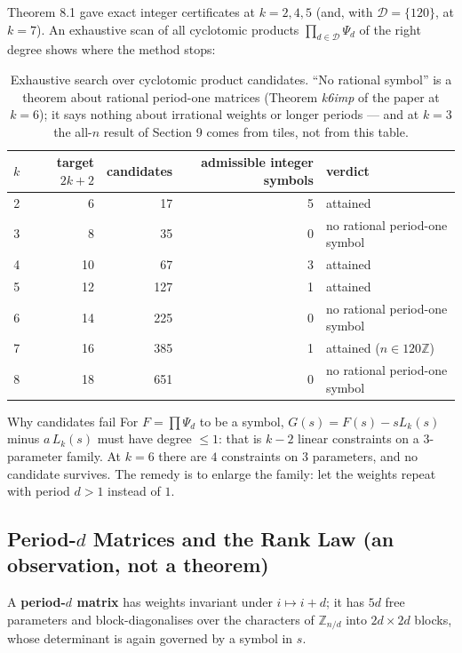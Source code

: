 \documentclass[11pt]{article}
\begin{document}
Theorem 8.1 gave exact integer certificates at $k=2,4,5$ (and, with $\mathcal D=\{120\}$, at $k=7$). An exhaustive scan of all cyclotomic products $\prod_{d\in\mathcal D}\Psi_d$ of the right degree shows where the method stops:

\begin{table}[htbp]
\centering
\begin{tabular}{crrrl}
\toprule
$k$ & target $2k+2$ & candidates & admissible integer symbols & verdict \\
\midrule
2 & 6 & 17 & 5 & attained \\
3 & 8 & 35 & 0 & no rational period-one symbol \\
4 & 10 & 67 & 3 & attained \\
5 & 12 & 127 & 1 & attained \\
6 & 14 & 225 & 0 & no rational period-one symbol \\
7 & 16 & 385 & 1 & attained ($n\in120\mathbb Z$) \\
8 & 18 & 651 & 0 & no rational period-one symbol \\
\bottomrule
\end{tabular}
\caption{Exhaustive search over cyclotomic product candidates. ``No rational symbol'' is a theorem about rational period-one matrices (Theorem \emph{k6imp} of the paper at $k=6$); it says nothing about irrational weights or longer periods --- and at $k=3$ the all-$n$ result of Section 9 comes from tiles, not from this table.}
\label{tab:exhaustive}
\end{table}

\begin{callbox}{Why candidates fail}
For $F=\prod\Psi_d$ to be a symbol, $G(s)=F(s)-sL_k(s)$ minus $a\,L_k(s)$ must have degree $\le1$: that is $k-2$ linear constraints on a 3-parameter family. At $k=6$ there are $4$ constraints on $3$ parameters, and no candidate survives. The remedy is to enlarge the family: let the weights repeat with period $d>1$ instead of $1$.
\end{callbox}

\subsection{Period-$d$ Matrices and the Rank Law (an observation, not a theorem)}

A \textbf{period-$d$ matrix} has weights invariant under $i\mapsto i+d$; it has $5d$ free parameters and block-diagonalises over the characters of $\mathbb Z_{n/d}$ into $2d\times2d$ blocks, whose determinant is again governed by a symbol in $s$.
\end{document}
